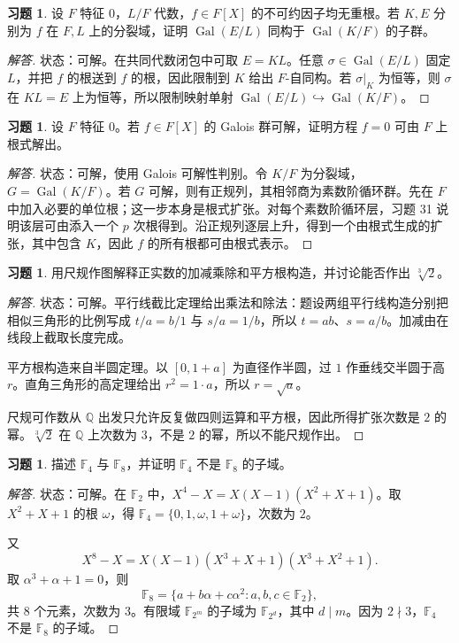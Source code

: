 \documentclass[11pt,a4paper,openany]{ctexbook}
\numberwithin{equation}{chapter}
\newcommand{\Q}{\mathbb{Q}}
\newcommand{\F}{\mathbb{F}}
\newcommand{\Gal}{\operatorname{Gal}}
\theoremstyle{plain}
\theoremstyle{definition}
\newtheorem{exercise}[theorem]{习题}
\theoremstyle{remark}
\begin{document}
\begin{exercise}
设 $F$ 特征 $0$，$L/F$ 代数，$f\in F[X]$ 的不可约因子均无重根。若 $K,E$ 分别为 $f$ 在 $F,L$ 上的分裂域，证明 $\Gal(E/L)$ 同构于 $\Gal(K/F)$ 的子群。
\end{exercise}
\begin{proof}[解答]
状态：可解。在共同代数闭包中可取 $E=KL$。任意 $\sigma\in\Gal(E/L)$ 固定 $L$，并把 $f$ 的根送到 $f$ 的根，因此限制到 $K$ 给出 $F$-自同构。若 $\sigma|_K$ 为恒等，则 $\sigma$ 在 $KL=E$ 上为恒等，所以限制映射单射 $\Gal(E/L)\hookrightarrow\Gal(K/F)$。
\end{proof}

\begin{exercise}
设 $F$ 特征 $0$。若 $f\in F[X]$ 的 Galois 群可解，证明方程 $f=0$ 可由 $F$ 上根式解出。
\end{exercise}
\begin{proof}[解答]
状态：可解，使用 Galois 可解性判别。令 $K/F$ 为分裂域，$G=\Gal(K/F)$。若 $G$ 可解，则有正规列，其相邻商为素数阶循环群。先在 $F$ 中加入必要的单位根；这一步本身是根式扩张。对每个素数阶循环层，习题 31 说明该层可由添入一个 $p$ 次根得到。沿正规列逐层上升，得到一个由根式生成的扩张，其中包含 $K$，因此 $f$ 的所有根都可由根式表示。
\end{proof}

\begin{exercise}
用尺规作图解释正实数的加减乘除和平方根构造，并讨论能否作出 $\sqrt[3]{2}$。
\end{exercise}
\begin{proof}[解答]
状态：可解。平行线截比定理给出乘法和除法：题设两组平行线构造分别把相似三角形的比例写成 $t/a=b/1$ 与 $s/a=1/b$，所以 $t=ab$、$s=a/b$。加减由在线段上截取长度完成。

平方根构造来自半圆定理。以 $[0,1+a]$ 为直径作半圆，过 $1$ 作垂线交半圆于高 $r$。直角三角形的高定理给出 $r^2=1\cdot a$，所以 $r=\sqrt a$。

尺规可作数从 $\Q$ 出发只允许反复做四则运算和平方根，因此所得扩张次数是 $2$ 的幂。$\sqrt[3]{2}$ 在 $\Q$ 上次数为 $3$，不是 $2$ 的幂，所以不能尺规作出。
\end{proof}

\begin{exercise}
描述 $\F_4$ 与 $\F_8$，并证明 $\F_4$ 不是 $\F_8$ 的子域。
\end{exercise}
\begin{proof}[解答]
状态：可解。在 $\F_2$ 中，$X^4-X=X(X-1)(X^2+X+1)$。取 $X^2+X+1$ 的根 $\omega$，得 $\F_4=\{0,1,\omega,1+\omega\}$，次数为 $2$。

又
\[
X^8-X=X(X-1)(X^3+X+1)(X^3+X^2+1).
\]
取 $\alpha^3+\alpha+1=0$，则
\[
\F_8=\{a+b\alpha+c\alpha^2:a,b,c\in\F_2\},
\]
共 $8$ 个元素，次数为 $3$。有限域 $\F_{2^m}$ 的子域为 $\F_{2^d}$，其中 $d\mid m$。因为 $2\nmid3$，$\F_4$ 不是 $\F_8$ 的子域。
\end{proof}
\end{document}
